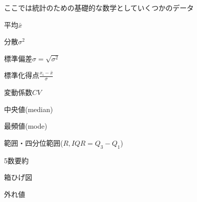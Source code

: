     ここでは統計のための基礎的な数学としていくつかのデータ

    平均$\bar{x}$

    分散$\sigma^2$
    
    標準偏差$\sigma= \sqrt{\sigma^2}$
    
    標準化得点$\frac{x_i- \bar{x}}{\sigma}$
    
    変動係数$CV$
    
    中央値(median)
    
    最頻値(mode)
    
    範囲・四分位範囲($R, IQR= Q_3- Q_1$)

    5数要約
    
    箱ひげ図
    
    外れ値
    